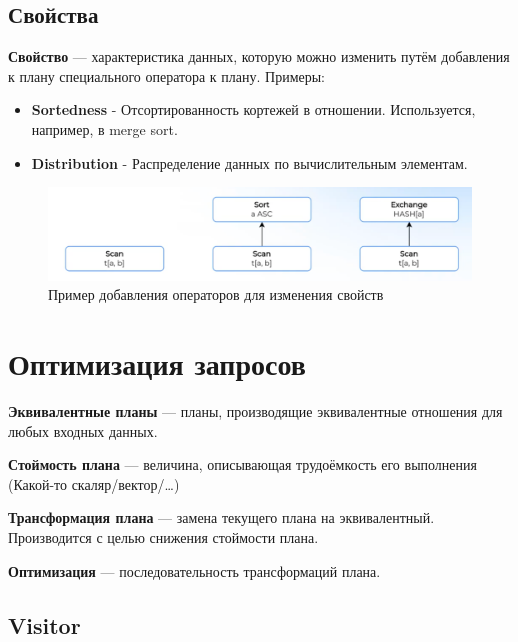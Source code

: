 \documentclass[11pt]{article}
\begin{document}
    \newpage

    \subsection*{Свойства}

    \textbf{Свойство} --- характеристика данных, которую можно изменить путём добавления к плану специального оператора к плану.
    Примеры:

    \begin{itemize}
        \item \textbf{Sortedness} - Отсортированность кортежей в отношении.
        Используется, например, в merge sort.
        \item \textbf{Distribution} - Распределение данных по вычислительным элементам.
    \end{itemize}

    \begin{figure}[h!]
        \centering
        \includegraphics[width=\textwidth]{Pictures/Metadata/Изменение свойств}
        \caption{Пример добавления операторов для изменения свойств}
        \label{fig:properties}
    \end{figure}

    \newpage

    \section*{Оптимизация запросов}
    \newline
    \textbf{Эквивалентные планы} --- планы, производящие эквивалентные отношения для любых входных данных.

    \textbf{Стоймость плана} --- величина, описывающая трудоёмкость его выполнения (Какой-то скаляр/вектор/\ldots)

    \textbf{Трансформация плана} --- замена текущего плана на эквивалентный.
    Производится с целью снижения стоймости плана.

    \textbf{Оптимизация} --- последовательность трансформаций плана.

    \subsection*{Visitor}
\end{document}
